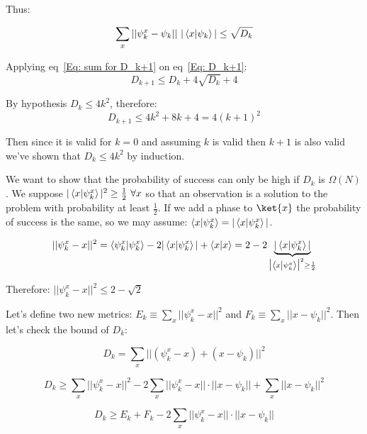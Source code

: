 Thus:

\begin{equation}
    \label{Eq: sum for D_k+1}
    \sum_x || \psi_k^x - \psi_k||\ |\left\langle{x}\middle\vert{\psi_k}\right\rangle| \leq \sqrt{D_k}
\end{equation}

Applying eq~\ref{Eq: sum for D_k+1} on eq~\ref{Eq: D_k+1}: 
\begin{equation}
    D_{k+1} \leq D_k + 4 \sqrt{D_k} + 4
\end{equation}

By hypothesis $D_k \leq 4k^2$, therefore:
\begin{equation}
    D_{k+1} \leq 4k^2 + 8k + 4 = 4(k+1)^2
\end{equation}

Then since it is valid for $k=0$ and assuming $k$ is valid then $k+1$ is also valid we've shown that $D_k \leq 4k^2$ by induction. \qedsymbol

We want to show that the probability of success can only be high if $D_k$ is $\Omega(N)$. We suppose $|\left\langle{x}\middle\vert{\psi_k^x}\right\rangle|^2 \geq \frac{1}{2} \ \forall x$ so that an observation is a solution to the problem with probability at least $\frac{1}{2}$. If we add a phase to $\ket{x}$ the probability of success is the same, so we may assume: $\left\langle{x}\middle\vert{\psi_k^x}\right\rangle = |\left\langle{x}\middle\vert{\psi_k^x}\right\rangle|$.

\begin{equation}
    || \psi^x_k - x ||^2 = \left\langle{\psi_k^x}\middle\vert{\psi_k^x}\right\rangle - 2|\left\langle{x}\middle\vert{\psi_k^x}\right\rangle| + \left\langle{x}\middle\vert{x}\right\rangle
        = 2 - 2\underbrace{|\left\langle{x}\middle\vert{\psi_k^x}\right\rangle|}_{\big|\left\langle{x}\middle\vert{\psi_k^x}\right\rangle\big|^2 \geq \frac{1}{2}}
\end{equation}

Therefore: $|| \psi^x_k - x ||^2 \leq 2 - \sqrt{2}$

Let's define two new metrics: $E_k \equiv \sum_x || \psi^x_k - x ||^2$ and $F_k \equiv \sum_x || x - \psi_k ||^2$. Then let's check the bound of $D_k$:

\begin{equation}
    D_k = \sum_x || (\psi^x_k - x) + (x - \psi_k) ||^2
\end{equation}

\begin{equation}
D_k \geq \sum_x ||\psi^x_k - x||^2 - 2 \sum_x ||\psi^x_k -x || \cdot ||x - \psi_k|| + \sum_x || x - \psi_k||^2
\end{equation}

\begin{equation}
D_k \geq E_k + F_k - 2 \sum_x ||\psi^x_k -x || \cdot ||x - \psi_k||
\end{equation}

